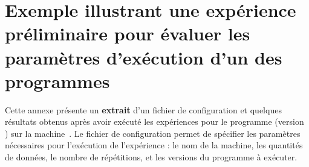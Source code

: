 \chapter{Exemple illustrant une expérience préliminaire pour évaluer les paramètres
d'exécution d'un des programmes}

\label{ExperiencesPreliminairesWordCount.ann}

Cette annexe pr\'esente un \textbf{extrait} d'un fichier de
configuration et quelques r\'esultats obtenus apr\`es avoir
ex\'ecut\'e les expériences pour le programme 
(version \ppff) sur la machine~. Le fichier de configuration permet
de sp\'ecifier les param\`etres nécessaires pour l'ex\'ecution de
l'exp\'erience : le nom de la machine, les quantit\'es de donn\'ees,
le nombre de r\'ep\'etitions, et les versions du programme \`a
ex\'ecuter.


\pagebreak



